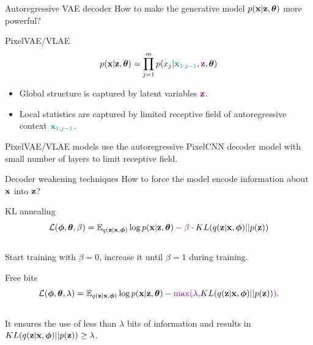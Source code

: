 \begin{frame}{Autoregressive VAE decoder}
	How to make the generative model $p(\mathbf{x} | \mathbf{z}, \boldsymbol{\theta})$ more powerful?
	\begin{block}{PixelVAE/VLAE}
		\vspace{-0.3cm}
		\[
			p(\mathbf{x} | \mathbf{z} , \boldsymbol{\theta}) = \prod_{j=1}^m p(x_j | {\color{teal}\mathbf{x}_{1:j - 1}}, {\color{violet}\mathbf{z}}, \boldsymbol{\theta})
		\]
		\begin{itemize}
			\item Global structure is captured by latent variables ${\color{violet}\mathbf{z}}$.
			\item Local statistics are captured by limited receptive field of autoregressive context ${\color{teal}\mathbf{x}_{1:j - 1}}$.
		\end{itemize}
	\end{block}
	PixelVAE/VLAE models use the autoregressive PixelCNN decoder model with small number of layers to limit receptive field.
\end{frame}
\begin{frame}{Decoder weakening techniques}
	How to force the model encode information about $\mathbf{x}$ into $\mathbf{z}$?
	\begin{block}{KL annealing}
		\vspace{-0.3cm}
		\[
		    \mathcal{L}(\boldsymbol{\phi}, \boldsymbol{\theta}, \beta) = \mathbb{E}_{q(\mathbf{z} | \mathbf{x}, \boldsymbol{\phi})} \log p(\mathbf{x} | \mathbf{z}, \boldsymbol{\theta}) - {\color{violet}\beta} \cdot KL (q(\mathbf{z} | \mathbf{x}, \boldsymbol{\phi}) || p(\mathbf{z}))
		\]
		\vspace{-0.3cm} \\
		Start training with $\beta = 0$, increase it until $\beta = 1$ during training.
	\end{block}
	\begin{block}{Free bits}
		\vspace{-0.3cm}
		\[
		    \mathcal{L}(\boldsymbol{\phi}, \boldsymbol{\theta}, \lambda) = \mathbb{E}_{q(\mathbf{z} | \mathbf{x}, \boldsymbol{\phi})} \log p(\mathbf{x} | \mathbf{z}, \boldsymbol{\theta}) - {\color{violet}\max(\lambda,} KL (q(\mathbf{z} | \mathbf{x}, \boldsymbol{\phi}) || p(\mathbf{z})){\color{violet})}.
		\]
		\vspace{-0.3cm} \\
		It ensures the use of less than $\lambda$ bits of information and results in $KL (q(\mathbf{z} | \mathbf{x}, \boldsymbol{\phi}) || p(\mathbf{z})) \geq \lambda$.
	\end{block}
\end{frame}
